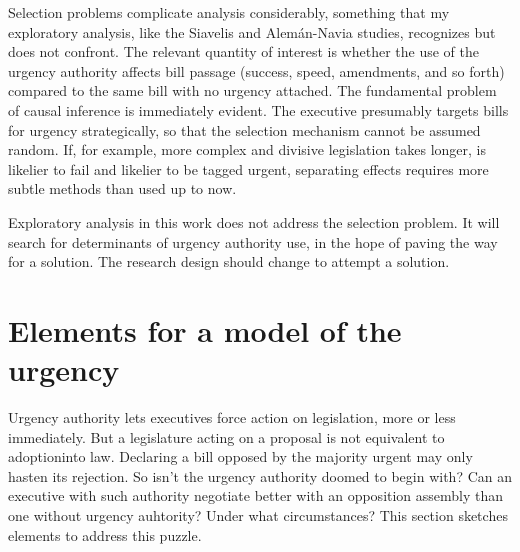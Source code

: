 \documentclass[letter,12pt]{article}
\begin{document}
Selection problems complicate analysis considerably, something that my exploratory analysis, like the Siavelis and Alemán-Navia studies, recognizes but does not confront. The relevant quantity of interest is whether the use of the urgency authority affects bill passage (success, speed, amendments, and so forth) compared to the same bill with no urgency attached. The fundamental problem of causal inference is immediately evident. The executive presumably targets bills for urgency strategically, so that the selection mechanism cannot be assumed random. If, for example, more complex and divisive legislation takes longer, is likelier to fail and likelier to be tagged urgent, separating effects requires more subtle methods than used up to now.

Exploratory analysis in this work does not address the selection problem. It will search for determinants of urgency authority use, in the hope of paving the way for a solution. The research design should change to attempt a solution. 

\section{Elements for a model of the urgency}

Urgency authority lets executives force action on legislation, more or less immediately. But a legislature acting on a proposal is not equivalent to adoptioninto law. Declaring a bill opposed by the majority urgent may only hasten its rejection. So isn't the urgency authority doomed to begin with? Can an executive with such authority negotiate better with an opposition assembly than one without urgency auhtority? Under what circumstances? This section sketches elements to address this puzzle. 


\end{document}
